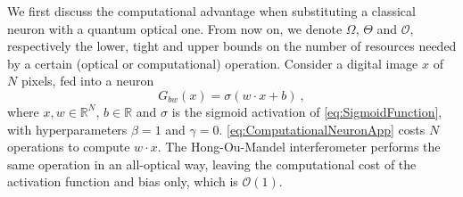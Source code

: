\documentclass[reprint,
superscriptaddress,
nofootinbib,
aps,
pra,
showkeys
]{revtex4-2}
\begin{document}
\begin{widetext}
We first discuss the computational advantage when substituting a classical neuron with a quantum optical one. From now on, we denote $\Omega$, $\Theta$ and $\mathcal{O}$, respectively the lower, tight and upper bounds on the number of resources needed by a certain (optical or computational) operation. Consider a digital image $x$ of $N$ pixels, fed into a neuron
\begin{equation}
	G_{bw}(x) = \sigma(w\cdot x + b) \ ,
	\label{eq:ComputationalNeuronApp}
\end{equation}
where $x, w \in \mathbb{R}^N$, $b \in \mathbb{R}$ and $\sigma$ is the sigmoid  activation of \cref{eq:SigmoidFunction}, with hyperparameters $\beta = 1$ and $\gamma = 0$. \cref{eq:ComputationalNeuronApp} costs $N$ operations to compute $w \cdot x$. The Hong-Ou-Mandel interferometer performs the same operation in an all-optical way, leaving the computational cost of the activation function and bias only, which is $\mathcal{O}(1)$.


\end{widetext}
\end{document}
